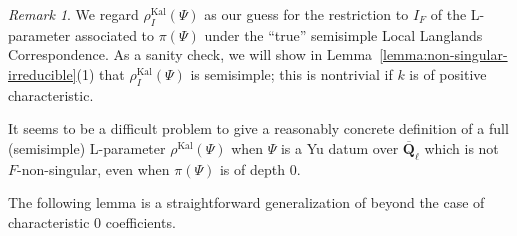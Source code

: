\documentclass[reqno]{amsart}
\numberwithin{equation}{subsection}
\newcommand{\F}{\mathbf{F}}
\newcommand{\Q}{\mathbf{Q}}
\newcommand{\ol}[1]{\overline{#1}}
\newcommand{\ld}{{}^L}
\newcommand\cT{\mathcal{T}}
\DeclareMathOperator{\FS}{FS}
\DeclareMathOperator{\Kal}{Kal}
\DeclareMathOperator{\Fr}{Fr}
\renewcommand{\ss}{\mathrm{ss}}
\theoremstyle{remark}
\newtheorem{remark}[thm]{Remark}
\numberwithin{equation}{subsection}
\numberwithin{figure}{subsection}
\begin{document}
\begin{remark}
We regard $\rho^{\Kal}_I(\Psi)$ as our guess for the restriction to $I_F$ of the L-parameter associated to $\pi(\Psi)$ under the ``true'' semisimple Local Langlands Correspondence. As a sanity check, we will show in Lemma~\ref{lemma:non-singular-irreducible}(1) that $\rho^{\Kal}_I(\Psi)$ is semisimple; this is nontrivial if $k$ is of positive characteristic.

It seems to be a difficult problem to give a reasonably concrete definition of a full (semisimple) L-parameter $\rho^{\Kal}(\Psi)$ when $\Psi$ is a Yu datum over $\ol\Q_\ell$ which is not $F$-non-singular, even when $\pi(\Psi)$ is of depth $0$.
\end{remark}




The following lemma is a straightforward generalization of \cite[Lemma~4.1.10]{Kal21b} beyond the case of characteristic $0$ coefficients.
\end{document}

